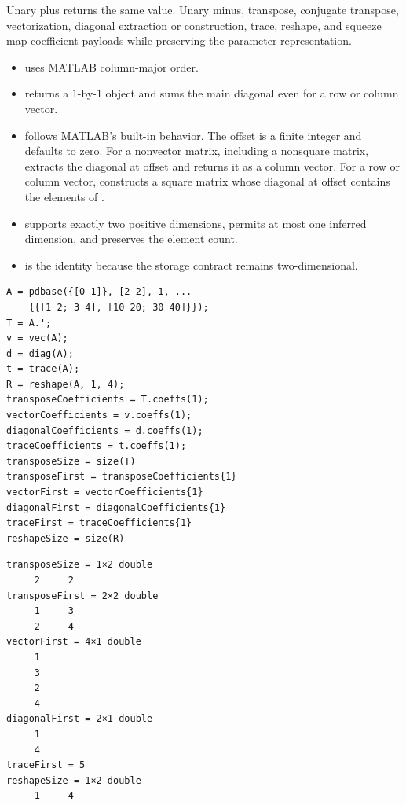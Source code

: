 \descriptionhead
Unary plus returns the same value. Unary minus, transpose, conjugate transpose, vectorization, diagonal extraction or construction, trace, reshape, and squeeze map coefficient payloads while preserving the parameter representation.
\begin{itemize}
    \item {} uses MATLAB column-major order.
    \item {} returns a $1$-by-$1$ object and sums the main diagonal even for a row or column vector.
    \item {} follows MATLAB's built-in behavior. The offset  is a finite integer and defaults to zero. For a nonvector matrix, including a nonsquare matrix,  extracts the diagonal at offset  and returns it as a column vector. For a row or column vector,  constructs a square matrix whose diagonal at offset  contains the elements of .
    \item {} supports exactly two positive dimensions, permits at most one inferred \code{[]} dimension, and preserves the element count.
    \item {} is the identity because the storage contract remains two-dimensional.
\end{itemize}

\examplehead
\begin{lstlisting}[style=dpmatlab]
A = pdbase({[0 1]}, [2 2], 1, ...
    {{[1 2; 3 4], [10 20; 30 40]}});
T = A.';
v = vec(A);
d = diag(A);
t = trace(A);
R = reshape(A, 1, 4);
transposeCoefficients = T.coeffs(1);
vectorCoefficients = v.coeffs(1);
diagonalCoefficients = d.coeffs(1);
traceCoefficients = t.coeffs(1);
transposeSize = size(T)
transposeFirst = transposeCoefficients{1}
vectorFirst = vectorCoefficients{1}
diagonalFirst = diagonalCoefficients{1}
traceFirst = traceCoefficients{1}
reshapeSize = size(R)
\end{lstlisting}
\begin{lstlisting}[style=dpoutput]
transposeSize = 1×2 double
     2     2
transposeFirst = 2×2 double
     1     3
     2     4
vectorFirst = 4×1 double
     1
     3
     2
     4
diagonalFirst = 2×1 double
     1
     4
traceFirst = 5
reshapeSize = 1×2 double
     1     4
\end{lstlisting}

